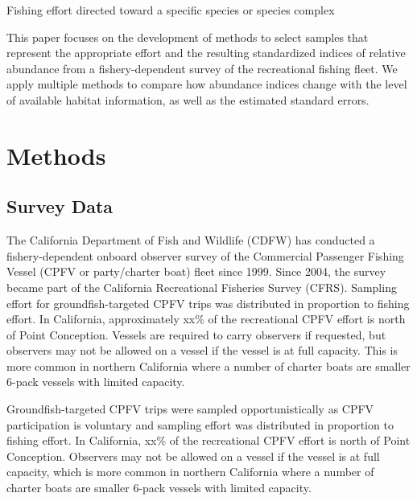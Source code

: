 \documentclass[preprint, 3p,
authoryear]{elsarticle} %
\begin{document}
Fishing effort directed toward a specific species or species complex

This paper focuses on the development of methods to select samples that
represent the appropriate effort and the resulting standardized indices
of relative abundance from a fishery-dependent survey of the
recreational fishing fleet. We apply multiple methods to compare how
abundance indices change with the level of available habitat
information, as well as the estimated standard errors.

\hypertarget{methods}{%
\section{Methods}\label{methods}}

\hypertarget{survey-data}{%
\subsection{Survey Data}\label{survey-data}}

The California Department of Fish and Wildlife (CDFW) has conducted a
fishery-dependent onboard observer survey of the Commercial Passenger
Fishing Vessel (CPFV or party/charter boat) fleet since 1999. Since
2004, the survey became part of the California Recreational Fisheries
Survey (CFRS). Sampling effort for groundfish-targeted CPFV trips was
distributed in proportion to fishing effort. In California,
approximately xx\% of the recreational CPFV effort is north of Point
Conception. Vessels are required to carry observers if requested, but
observers may not be allowed on a vessel if the vessel is at full
capacity. This is more common in northern California where a number of
charter boats are smaller 6-pack vessels with limited capacity.

Groundfish-targeted CPFV trips were sampled opportunistically as CPFV
participation is voluntary and sampling effort was distributed in
proportion to fishing effort. In California, xx\% of the recreational
CPFV effort is north of Point Conception. Observers may not be allowed
on a vessel if the vessel is at full capacity, which is more common in
northern California where a number of charter boats are smaller 6-pack
vessels with limited capacity.
\end{document}
